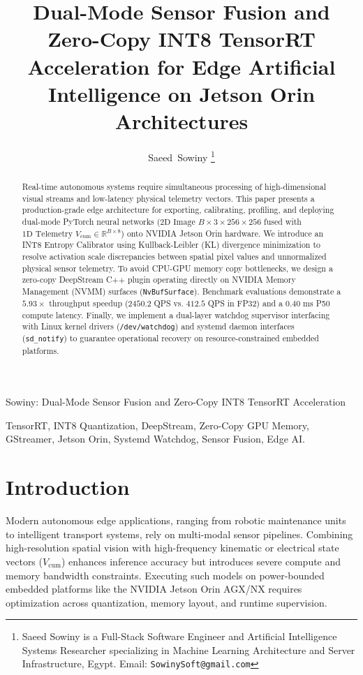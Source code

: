 \documentclass[10pt,journal,compsoc]{IEEEtran}
\begin{document}
\title{Dual-Mode Sensor Fusion and Zero-Copy INT8 TensorRT Acceleration for Edge Artificial Intelligence on Jetson Orin Architectures}

\author{Saeed~Sowiny
\thanks{Saeed Sowiny is a Full-Stack Software Engineer and Artificial Intelligence Systems Researcher specializing in Machine Learning Architecture and Server Infrastructure, Egypt. Email: \texttt{SowinySoft@gmail.com}}}

%
{Sowiny: Dual-Mode Sensor Fusion and Zero-Copy INT8 TensorRT Acceleration}

\maketitle

\begin{abstract}
Real-time autonomous systems require simultaneous processing of high-dimensional visual streams and low-latency physical telemetry vectors. This paper presents a production-grade edge architecture for exporting, calibrating, profiling, and deploying dual-mode PyTorch neural networks ($2\text{D Image } B \times 3 \times 256 \times 256$ fused with $1\text{D Telemetry } V_{\text{cum}} \in \mathbb{R}^{B \times 8}$) onto NVIDIA Jetson Orin hardware. We introduce an INT8 Entropy Calibrator using Kullback-Leibler (KL) divergence minimization to resolve activation scale discrepancies between spatial pixel values and unnormalized physical sensor telemetry. To avoid CPU-GPU memory copy bottlenecks, we design a zero-copy DeepStream C++ plugin operating directly on NVIDIA Memory Management (NVMM) surfaces (\texttt{NvBufSurface}). Benchmark evaluations demonstrate a $5.93\times$ throughput speedup ($2450.2$ QPS vs. $412.5$ QPS in FP32) and a $0.40\text{~ms}$ P50 compute latency. Finally, we implement a dual-layer watchdog supervisor interfacing with Linux kernel drivers (\texttt{/dev/watchdog}) and systemd daemon interfaces (\texttt{sd\_notify}) to guarantee operational recovery on resource-constrained embedded platforms.
\end{abstract}

\begin{IEEEkeywords}
TensorRT, INT8 Quantization, DeepStream, Zero-Copy GPU Memory, GStreamer, Jetson Orin, Systemd Watchdog, Sensor Fusion, Edge AI.
\end{IEEEkeywords}

\section{Introduction}
Modern autonomous edge applications, ranging from robotic maintenance units to intelligent transport systems, rely on multi-modal sensor pipelines. Combining high-resolution spatial vision with high-frequency kinematic or electrical state vectors ($V_{\text{cum}}$) enhances inference accuracy but introduces severe compute and memory bandwidth constraints. Executing such models on power-bounded embedded platforms like the NVIDIA Jetson Orin AGX/NX requires optimization across quantization, memory layout, and runtime supervision.
\end{document}
